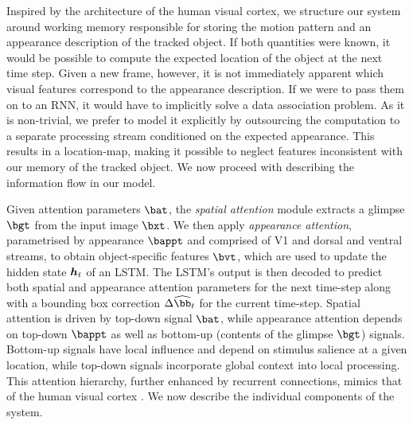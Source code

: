 	Inspired by the architecture of the human visual cortex, we structure our system around working memory responsible for storing the motion pattern and an appearance description of the tracked object. If both quantities were known, it would be possible to compute the expected location of the object at the next time step. Given a new frame, however, it is not immediately apparent which visual features correspond to the appearance description. If we were to pass them on to an RNN, it would have to implicitly solve a data association problem. As it is non-trivial, we prefer to model it explicitly by outsourcing the computation to a separate processing stream conditioned on the expected appearance. This results in a location-map, making it possible to neglect features inconsistent with our memory of the tracked object. We now proceed with describing the information flow in our model.
	    
    
    Given attention parameters $\bat$, the \emph{spatial attention} module extracts a glimpse $\bgt$ from the input image $\bxt$. We then apply \emph{appearance attention}, parametrised by appearance $\bappt$ and comprised of V1 and dorsal and ventral streams, to obtain object-specific features $\bvt$, which are used to update the hidden state $\B{h}_t$ of an LSTM. The LSTM's output is then decoded to predict both spatial and appearance attention parameters for the next time-step along with a bounding box correction $\Delta \widehat{\bb}_t$ for the current time-step.
    Spatial attention is driven by top-down signal $\bat$, while appearance attention depends on top-down $\bappt$ as well as bottom-up (contents of the glimpse $\bgt$) signals. Bottom-up signals have local influence and depend on stimulus salience at a given location, while top-down signals incorporate global context into local processing. This attention hierarchy, further enhanced by recurrent connections, mimics that of the human visual cortex \cite{Ungerleider2000}. We now describe the individual components of the system.
    
